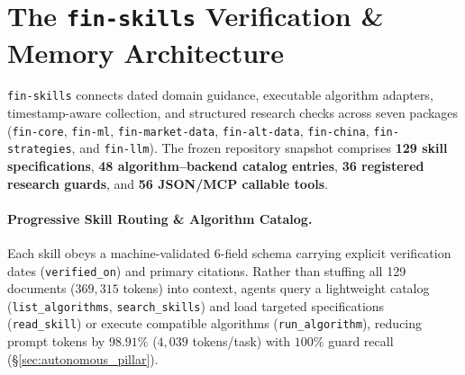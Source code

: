 \section{The \texttt{fin-skills} Verification \& Memory Architecture}
\label{sec:preliminaries}

\texttt{fin-skills} connects dated domain guidance, executable algorithm adapters, timestamp-aware collection, and structured research checks across seven packages (\texttt{fin-core}, \texttt{fin-ml}, \texttt{fin-market-\allowbreak data}, \texttt{fin-alt-\allowbreak data}, \texttt{fin-china}, \texttt{fin-\allowbreak strategies}, and \texttt{fin-llm}). The frozen repository snapshot comprises \textbf{129 skill specifications}, \textbf{48 algorithm--backend catalog entries}, \textbf{36 registered research guards}, and \textbf{56 JSON/MCP callable tools}.

\paragraph{Progressive Skill Routing \& Algorithm Catalog.}
Each skill obeys a machine-validated 6-field schema carrying explicit verification dates (\texttt{verified\_on}) and primary citations. Rather than stuffing all 129 documents ($369{,}315$ tokens) into context, agents query a lightweight catalog (\texttt{list\_algorithms}, \texttt{search\_skills}) and load targeted specifications (\texttt{read\_skill}) or execute compatible algorithms (\texttt{run\_algorithm}), reducing prompt tokens by $\mathbf{98.91\%}$ ($4{,}039$ tokens/task) with $100\%$ guard recall (\S\ref{sec:autonomous_pillar}).

